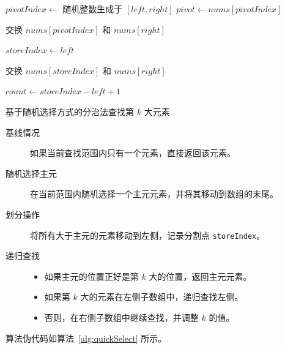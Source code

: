 \begin{algorithm}[htbp]
    \label{alg:quickSelect}
    \SetAlgoLined
    
    
    $pivotIndex \leftarrow$ 随机整数生成于 $[left, right]$ \;
    $pivot \leftarrow nums[pivotIndex]$\;
    
    交换 $nums[pivotIndex]$ 和 $nums[right]$\;
    
    $storeIndex \leftarrow left$\;
    
    交换 $nums[storeIndex]$ 和 $nums[right]$\;
    
    $count \leftarrow storeIndex - left + 1$\;
    
    \caption{基于随机选择方式的分治法查找第 $k$ 大元素}
    \end{algorithm}    
    \begin{description}
        \item[基线情况] 如果当前查找范围内只有一个元素，直接返回该元素。
        \item[随机选择主元] 在当前范围内随机选择一个主元元素，并将其移动到数组的末尾。
        \item[划分操作] 将所有大于主元的元素移动到左侧，记录分割点 \texttt{storeIndex}。
        \item[递归查找] \begin{itemize}
            \item 如果主元的位置正好是第 $k$ 大的位置，返回主元元素。
            \item 如果第 $k$ 大的元素在左侧子数组中，递归查找左侧。
            \item 否则，在右侧子数组中继续查找，并调整 $k$ 的值。
        \end{itemize}
    \end{description}
    算法伪代码如算法~\autoref{alg:quickSelect} 所示。
